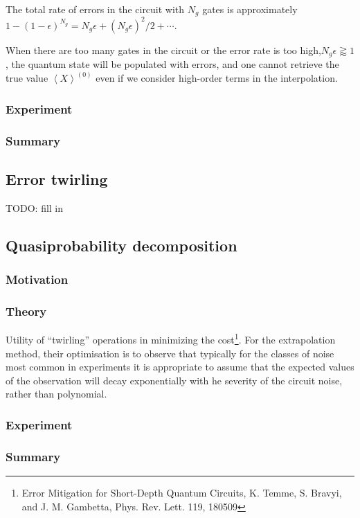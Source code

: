 \documentclass[11pt, oneside]{article}   	%
\begin{document}
The total rate of errors in the circuit with $N_g$ gates is approximately $1 - (1 - \epsilon)^{N_g} = N_g \epsilon + (N_g \epsilon)^2 / 2 + \cdots$.

When there are too many gates in the circuit or the error rate is too high,$N_g \epsilon \gtrapprox 1$, the quantum state will be populated with errors, and one cannot retrieve the true value $\left< X \right>^{(0)}$ even if we consider high-order terms in the interpolation.

\subsubsection{Experiment}
\subsubsection{Summary}

\subsection{Error twirling}
TODO: fill in

\subsection{Quasiprobability decomposition}
\subsubsection{Motivation}
\subsubsection{Theory}
Utility of ``twirling'' operations in minimizing the cost\footnote{Error Mitigation for Short-Depth Quantum Circuits, K. Temme, S. Bravyi, and J. M. Gambetta, Phys. Rev. Lett. 119, 180509}.
For the extrapolation method, their optimisation is to observe that typically for the classes of noise most common in experiments it is appropriate to assume that the expected values of the observation will decay exponentially with he severity of the circuit noise, rather than polynomial.

\subsubsection{Experiment}
\subsubsection{Summary}
\end{document}
